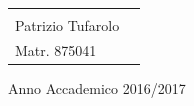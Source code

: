 \begin{titlepage}
\begin{center}
\begin{minipage}{\linewidth}
\begin{tabular}{l r}
\begin{minipage}{.50\linewidth}
\begin{flushleft}
          \end{flushleft}
        \end{minipage}
        &
        \begin{minipage}{.45\linewidth}
          \begin{flushright}
            {\large
              TESI DI LAUREA DI\\[.3cm]
              Patrizio Tufarolo\\[.45cm]
              Matr. 875041
            }
          \end{flushright}
        \end{minipage}
      \end{tabular}
    \end{minipage}
    
    \vfill
    {\large{{Anno Accademico 2016/2017}}}
  \end{center}
\end{titlepage}


